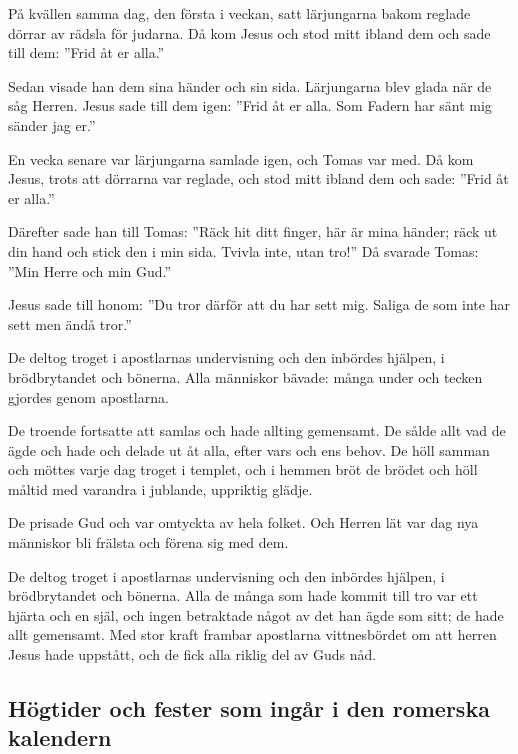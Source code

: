 {På kvällen samma dag, den första i veckan, satt lärjungarna bakom reglade dörrar av rädsla för judarna. Då kom Jesus och stod mitt ibland dem och sade till dem: ”Frid åt er alla.” 

Sedan visade han dem sina händer och sin sida. Lärjungarna blev glada när de såg Herren. 
Jesus sade till dem igen: ”Frid åt er alla. Som Fadern har sänt mig sänder jag er.”}


{En vecka senare var lärjungarna samlade igen, och Tomas var med. Då kom Jesus, trots att dörrarna var reglade, och stod mitt ibland dem och sade: ”Frid åt er alla.” 

Därefter sade han till Tomas: ”Räck hit ditt finger, här är mina händer; räck ut din hand och stick den i min sida. Tvivla inte, utan tro!” Då svarade Tomas: ”Min Herre och min Gud.” 

Jesus sade till honom: ”Du tror därför att du har sett mig. Saliga de som inte har sett men ändå tror.”}


{De deltog troget i apostlarnas undervisning och den inbördes hjälpen, i brödbrytandet och bönerna. Alla människor bävade: många under och tecken gjordes genom apostlarna. 

De troende fortsatte att samlas och hade allting gemensamt. De sålde allt vad de ägde och hade och delade ut åt alla, efter vars och ens behov. De höll samman och möttes varje dag troget i templet, och i hemmen bröt de brödet och höll måltid med varandra i jublande, uppriktig glädje. 

De prisade Gud och var omtyckta av hela folket. Och Herren lät var dag nya människor bli frälsta och förena sig med dem.}


{De deltog troget i apostlarnas undervisning och den inbördes hjälpen, i brödbrytandet och bönerna. Alla de många som hade kommit till tro var ett hjärta och en själ, och ingen betraktade något av det han ägde som sitt; de hade allt gemensamt. Med stor kraft frambar apostlarna vittnesbördet om att herren Jesus hade uppstått, och de fick alla riklig del av Guds nåd.}


\vspace{25 mm}
\subsection{Högtider och fester som ingår i den romerska kalendern}

